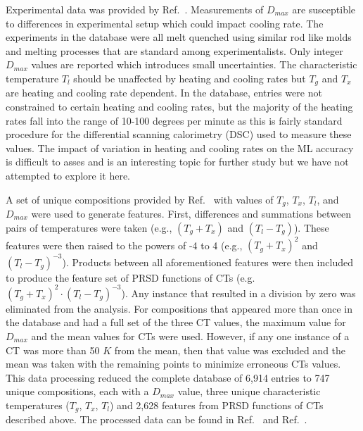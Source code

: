 \documentclass[11pt,a4paper]{article}
\begin{document}
\par
Experimental data was provided by Ref.~\cite{metallic_glasses_data}. Measurements of $D_{max}$ are susceptible to differences in experimental setup which could impact cooling rate.  The experiments in the database were all melt quenched using similar rod like molds and melting processes that are standard among experimentalists. Only integer $D_{max}$ values are reported which introduces small uncertainties. The characteristic temperature $T_{l}$ should be unaffected by heating and cooling rates but $T_g$ and $T_x$ are heating and cooling rate dependent.  In the database, entries were not constrained to certain heating and cooling rates, but the majority of the heating rates fall into the range of 10-100 degrees per minute as this is fairly standard procedure for the differential scanning calorimetry (DSC) used to measure these values. The impact of variation in heating and cooling rates on the ML accuracy is difficult to asses and is an interesting topic for further study but we have not attempted to explore it here.

\par
A set of unique compositions provided by Ref.~\cite{metallic_glasses_data} with values of $T_{g}$, $T_{x}$, $T_{l}$, and $D_{max}$ were used to generate features. First, differences and summations between pairs of temperatures were taken (e.g., $(T_{g}+T_{x})$ and $(T_{l}-T_{g})$). These features were then raised to the powers of -4 to 4 (e.g., $(T_{g}+T_{x})^{2}$ and $(T_{l}-T_{g})^{-3}$). Products between all aforementioned features were then included to produce the feature set of PRSD functions of CTs (e.g. $(T_{g}+T_{x})^{2} \cdot (T_{l}-T_{g})^{-3}$). Any instance that resulted in a division by zero was eliminated from the analysis. For compositions that appeared more than once in the database and had a full set of the three CT values, the maximum value for $D_{max}$ and the mean values for CTs were used. However, if any one instance of a CT was more than 50 $K$ from the mean, then that value was excluded and the mean was taken with the remaining points to minimize erroneous CTs values. This data processing reduced the complete database of 6,914 entries to 747 unique compositions, each with a $D_{max}$ value, three unique characteristic temperatures ($T_{g}$, $T_{x}$, $T_{l}$) and 2,628 features from PRSD functions of CTs described above. The processed data can be found in Ref.~\cite{GB_model} and Ref.~\cite{Morgan2021}.
\end{document}
